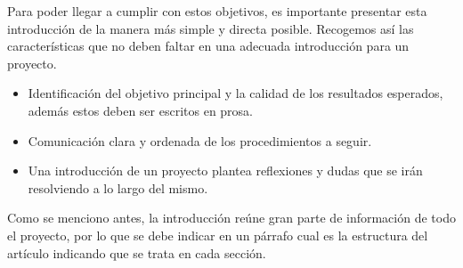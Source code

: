 \documentclass[runningheads]{llncs}
\begin{document}
Para poder llegar a cumplir con estos objetivos, es importante presentar esta introducción de la manera más simple y directa posible. Recogemos así las características que no deben faltar en una adecuada introducción para un proyecto.
\begin{itemize}
    \item Identificación del objetivo principal y la calidad de los resultados esperados, además estos deben ser escritos en prosa.
    \item Comunicación clara y ordenada de los procedimientos a seguir.
    \item Una introducción de un proyecto plantea reflexiones y dudas que se irán resolviendo a lo largo del mismo.
\end{itemize}
Como se menciono antes, la introducción reúne gran parte de información de todo el proyecto, por lo que se debe indicar en un párrafo cual es la estructura del artículo indicando que se trata en cada sección.
\end{document}
